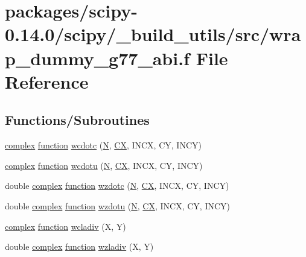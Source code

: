 \hypertarget{wrap__dummy__g77__abi_8f}{}\section{packages/scipy-\/0.14.0/scipy/\+\_\+build\+\_\+utils/src/wrap\+\_\+dummy\+\_\+g77\+\_\+abi.f File Reference}
\label{wrap__dummy__g77__abi_8f}
\subsection*{Functions/\+Subroutines}
\begin{DoxyCompactItemize}
\item 
\hyperlink{structcomplex}{complex} \hyperlink{afunc_8m_a7b5e596df91eadea6c537c0825e894a7}{function} \hyperlink{wrap__dummy__g77__abi_8f_a010a6db968e22d44533fdc5034326502}{wcdotc} (\hyperlink{polmisc_8c_a0240ac851181b84ac374872dc5434ee4}{N}, \hyperlink{scsum1_8c_a5a76da95c549c41790389a76e12fdcb5}{C\+X}, I\+N\+C\+X, C\+Y, I\+N\+C\+Y)
\item 
\hyperlink{structcomplex}{complex} \hyperlink{afunc_8m_a7b5e596df91eadea6c537c0825e894a7}{function} \hyperlink{wrap__dummy__g77__abi_8f_a455b449b4405f656fd200cbe5a3c8c79}{wcdotu} (\hyperlink{polmisc_8c_a0240ac851181b84ac374872dc5434ee4}{N}, \hyperlink{scsum1_8c_a5a76da95c549c41790389a76e12fdcb5}{C\+X}, I\+N\+C\+X, C\+Y, I\+N\+C\+Y)
\item 
double \hyperlink{structcomplex}{complex} \hyperlink{afunc_8m_a7b5e596df91eadea6c537c0825e894a7}{function} \hyperlink{wrap__dummy__g77__abi_8f_a56e918d321922abf047ad523b00d5658}{wzdotc} (\hyperlink{polmisc_8c_a0240ac851181b84ac374872dc5434ee4}{N}, \hyperlink{scsum1_8c_a5a76da95c549c41790389a76e12fdcb5}{C\+X}, I\+N\+C\+X, C\+Y, I\+N\+C\+Y)
\item 
double \hyperlink{structcomplex}{complex} \hyperlink{afunc_8m_a7b5e596df91eadea6c537c0825e894a7}{function} \hyperlink{wrap__dummy__g77__abi_8f_a4fab42819125488dda665c3f31d8dcad}{wzdotu} (\hyperlink{polmisc_8c_a0240ac851181b84ac374872dc5434ee4}{N}, \hyperlink{scsum1_8c_a5a76da95c549c41790389a76e12fdcb5}{C\+X}, I\+N\+C\+X, C\+Y, I\+N\+C\+Y)
\item 
\hyperlink{structcomplex}{complex} \hyperlink{afunc_8m_a7b5e596df91eadea6c537c0825e894a7}{function} \hyperlink{wrap__dummy__g77__abi_8f_ad90ecce5efe253efbf605ccc0f4c80bd}{wcladiv} (X, Y)
\item 
double \hyperlink{structcomplex}{complex} \hyperlink{afunc_8m_a7b5e596df91eadea6c537c0825e894a7}{function} \hyperlink{wrap__dummy__g77__abi_8f_a87da858fbb51b8d8f5d8c942dbddaf38}{wzladiv} (X, Y)
\end{DoxyCompactItemize}


